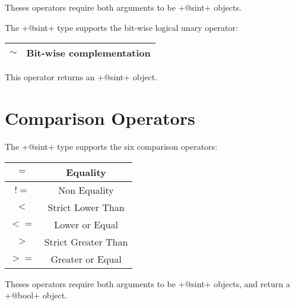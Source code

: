 Theses operators require both arguments to be \ggs+@sint+ objects.\newline


The \ggs+@sint+ type supports the bit-wise logical unary operator:\newline

\begin{tabular}{|c|c|}
\hline
$\sim$ & Bit-wise complementation \\
\hline
\end{tabular}

This operator returns an \ggs+@sint+ object.







\section{Comparison Operators}

The \ggs+@sint+ type supports the six comparison operators:\newline

\begin{tabular}{|c|c|}
\hline
$=$ & Equality \\
\hline
$!=$ & Non Equality \\
\hline
$<$  & Strict Lower Than \\
\hline
$<=$  & Lower or Equal \\
\hline
$>$  & Strict Greater Than \\
\hline
$>=$  & Greater or Equal \\
\hline
\end{tabular}

Theses operators require both arguments to be \ggs+@sint+ objects, and return a \ggs+@bool+ object.


